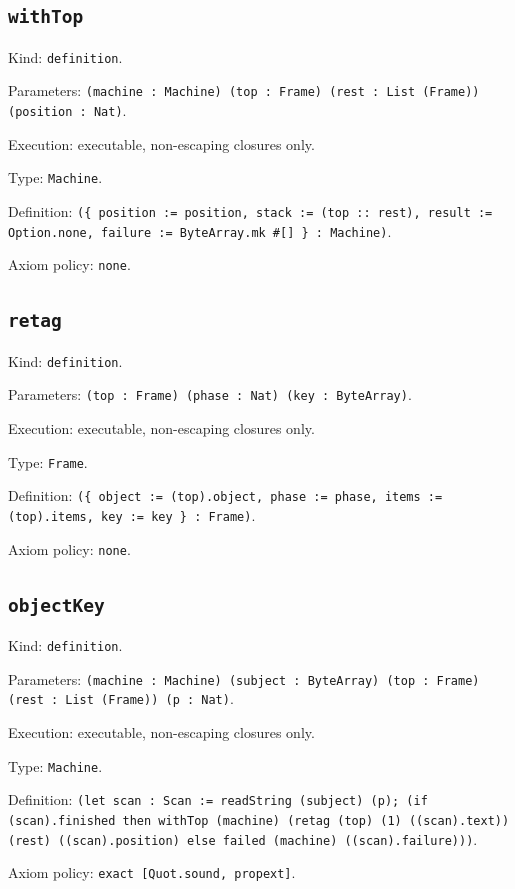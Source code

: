 \documentclass[11pt]{article}
\begin{document}
\subsection*{\texttt{withTop}}
\noindent Kind: \texttt{definition}.\par
\noindent Parameters: \texttt{(machine : Machine) (top : Frame) (rest : List (Frame)) (position : Nat)}.\par
\noindent Execution: executable, non-escaping closures only.\par
\noindent Type: \texttt{Machine}.\par
\noindent Definition: \texttt{(\{ position := position, stack := (top :: rest), result := Option.none, failure := ByteArray.mk \#[] \} : Machine)}.\par
\noindent Axiom policy: \texttt{none}.\par
\subsection*{\texttt{retag}}
\noindent Kind: \texttt{definition}.\par
\noindent Parameters: \texttt{(top : Frame) (phase : Nat) (key : ByteArray)}.\par
\noindent Execution: executable, non-escaping closures only.\par
\noindent Type: \texttt{Frame}.\par
\noindent Definition: \texttt{(\{ object := (top).object, phase := phase, items := (top).items, key := key \} : Frame)}.\par
\noindent Axiom policy: \texttt{none}.\par
\subsection*{\texttt{objectKey}}
\noindent Kind: \texttt{definition}.\par
\noindent Parameters: \texttt{(machine : Machine) (subject : ByteArray) (top : Frame) (rest : List (Frame)) (p : Nat)}.\par
\noindent Execution: executable, non-escaping closures only.\par
\noindent Type: \texttt{Machine}.\par
\noindent Definition: \texttt{(let scan : Scan := readString (subject) (p); (if (scan).finished then withTop (machine) (retag (top) (1) ((scan).text)) (rest) ((scan).position) else failed (machine) ((scan).failure)))}.\par
\noindent Axiom policy: \texttt{exact [Quot.sound, propext]}.\par
\end{document}
